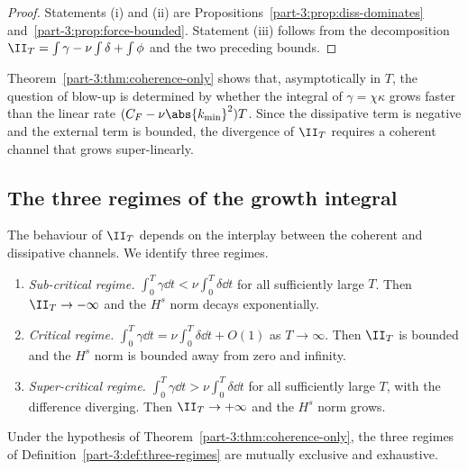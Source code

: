 \begin{proof}
Statements (i) and (ii) are Propositions~\ref{part-3:prop:diss-dominates} 
and~\ref{part-3:prop:force-bounded}. Statement (iii) follows from the 
decomposition $\II_T = \int\gamma - \nu\int\delta + \int\phi$ and the 
two preceding bounds.
\end{proof}

\begin{remark}[Interpretation]\label{part-3:rem:interp}
Theorem~\ref{part-3:thm:coherence-only} shows that, asymptotically in $T$, 
the question of blow-up is determined by whether the integral of 
$\gamma = \chi\kappa$ grows faster than the linear rate 
$(C_F - \nu\abs{k_{\min}}^2)T$. Since the dissipative term is 
negative and the external term is bounded, the divergence of 
$\II_T$ requires a coherent channel that grows super-linearly.
\end{remark}

\subsection{The three regimes of the growth integral}
\label{part-3:ssec:three-regimes}

The behaviour of $\II_T$ depends on the interplay between the 
coherent and dissipative channels. We identify three regimes.

\begin{definition}\label{part-3:def:three-regimes}
\begin{enumerate}[label=(\roman*),leftmargin=*]
\item \emph{Sub-critical regime.} 
      $\int_0^T\gamma\dd t < \nu\int_0^T\delta\dd t$ for all 
      sufficiently large $T$. Then $\II_T\to-\infty$ and the $H^s$ 
      norm decays exponentially.
\item \emph{Critical regime.} 
      $\int_0^T\gamma\dd t = \nu\int_0^T\delta\dd t + O(1)$ as 
      $T\to\infty$. Then $\II_T$ is bounded and the $H^s$ norm is 
      bounded away from zero and infinity.
\item \emph{Super-critical regime.} 
      $\int_0^T\gamma\dd t > \nu\int_0^T\delta\dd t$ for all 
      sufficiently large $T$, with the difference diverging. Then 
      $\II_T\to+\infty$ and the $H^s$ norm grows.
\end{enumerate}
\end{definition}

\begin{proposition}\label{part-3:prop:regime-separation}
Under the hypothesis of Theorem~\ref{part-3:thm:coherence-only}, the three 
regimes of Definition~\ref{part-3:def:three-regimes} are mutually exclusive 
and exhaustive.
\end{proposition}

